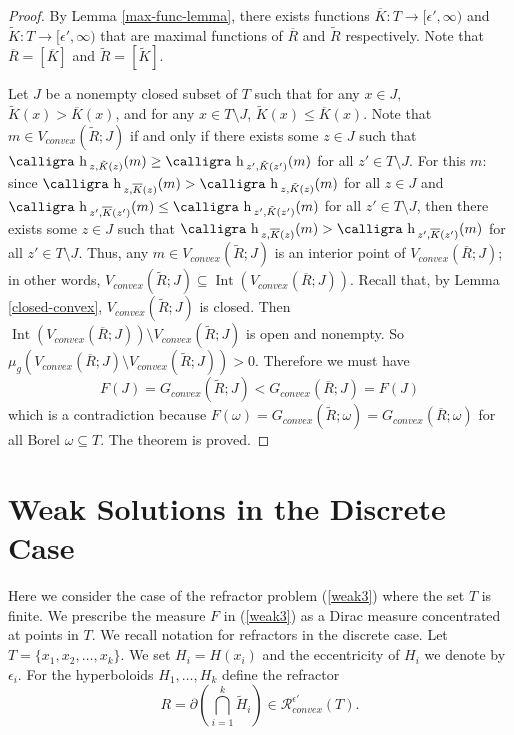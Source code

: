 \documentclass[review]{elsarticle}
\DeclareMathOperator*{\Int}{Int}
\newcommand{\h}{\text{\calligra h}\,}
\begin{document}
\begin{proof}
By Lemma \ref{max-func-lemma}, there exists functions $\overline{K}:T\to[\epsilon', \infty)$ and $\tilde{K}:T\to[\epsilon', \infty)$ that are maximal functions of $\overline{R}$ and $\tilde{R}$ respectively. Note that $\overline{R}=[\overline{K}]$ and $\tilde{R}=[\tilde{K}]$.

    Let $J$ be a nonempty closed subset of $T$ such that for any $x \in J,$ $\tilde{K}(x)> \overline{K}(x)$, and for any $x\in T\setminus J$, $\tilde{K}(x)\le \overline{K}(x)$. Note that $m\in V_{convex}(\tilde{R};J)$ if and only if there exists some $z\in J$ such that $\h_{z,\tilde{K}(z)}(m)\ge \h_{z',\tilde{K}(z')}(m)$ for all $z'\in T\setminus J.$ For this $m$: since $\h_{z,\overline{K}(z)}(m)>\h_{z,\tilde{K}(z)}(m)$ for all $z\in J$ and $\h_{z',\overline{K}(z')}(m)\le \h_{z',\tilde{K}(z')}(m)$ for all $z'\in T\setminus J$, then there exists some $z\in J$ such that $\h_{z,\overline{K}(z)}(m)> \h_{z',\overline{K}(z')}(m)$ for all $z'\in T\setminus J$. Thus, any $m \in V_{convex}(\tilde{R};J)$ is an interior point of $V_{convex}(\overline{R};J)$; in other words, $V_{convex}(\tilde{R};J)\subseteq \Int(V_{convex}(\overline{R};J))$. Recall that, by Lemma \ref{closed-convex}, $V_{convex}(\tilde{R};J)$ is closed. Then $\Int(V_{convex}(\overline{R};J))\setminus V_{convex}(\tilde{R};J)$ is open and nonempty. So $\mu_g(V_{convex}(\overline{R};J)\setminus V_{convex}(\tilde{R};J))>0$. Therefore we must have
    \begin{equation}
        F(J)=G_{convex}(\tilde{R};J)<G_{convex}(\overline{R};J)=F(J)
    \end{equation}
which is a contradiction because $F(\omega)=G_{convex}(\tilde{R};\omega)=G_{convex}(\overline{R};\omega)$ for all Borel $\omega\subseteq T.$ The theorem is proved.
\end{proof}



\section{Weak Solutions in the Discrete Case}

 Here we consider the case of the refractor problem (\ref{weak3}) where the set $T$ is finite. We prescribe the measure $F$ in (\ref{weak3}) as a Dirac measure concentrated at points in $T.$  We recall notation for refractors in the discrete case. Let $T=\{x_1,x_2,\dots,x_k\}$. We set $H_i = H(x_i)$ and the eccentricity of $H_i$ we denote by $\epsilon_i$. For the hyperboloids $H_1,\dots,H_k$ define the refractor
\begin{equation}
    R= \partial\left(\bigcap_{i=1}^k \tilde{H}_i\right)\in \mathcal{R}_{convex}^{\epsilon'}(T).
\end{equation}
\end{document}
